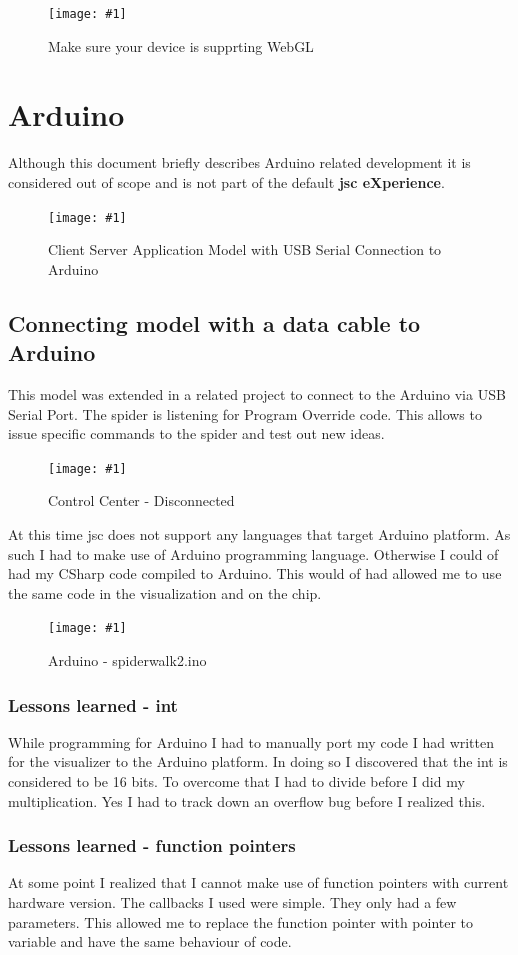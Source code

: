 \documentclass[12pt,leqno]{book}
\newcommand{\png}[1]{\texttt{[image: \#1]}}
\newcommand{\figpng}[2]{\begin{figure}[htb]\centering\png{#1}\caption{#2}\end{figure}}
\begin{document}
\figpng{Images/aboutgpu_-_Google_Chrome-2012-03-14_17.56.30}
{Make sure your device is supprting WebGL}





\chapter{Arduino}

Although this document briefly describes Arduino related development it is considered out of scope and is not part of the default \textbf{jsc eXperience}.

\figpng{Images/withusb}
{Client Server Application Model with USB Serial Connection to Arduino}

\section{Connecting model with a data cable to Arduino}
This model was extended in a related project to connect to the Arduino via USB Serial Port. 
The spider is listening for Program Override code. This allows to issue specific commands to the spider
and test out new ideas.

\figpng{Images/Hello_world_-_Google_Chrome-2012-03-15_08.11.17}
{Control Center - Disconnected}




At this time jsc does not support any languages that target Arduino platform. As such I had to make use of Arduino programming language. Otherwise I could of had my CSharp code compiled to Arduino. This would of had allowed me to use the same code in the visualization and on the chip.

\figpng{Images/spiderwalk2__Arduino_1.0-2012-03-14_18.04.43}
{Arduino - spiderwalk2.ino}


\subsection{Lessons learned - int}
While programming for Arduino I had to manually port my code I had written for the visualizer to the Arduino platform. In doing so I discovered that the int is considered to be 16 bits.  To overcome that I had to divide before I did my multiplication. Yes I had to track down an overflow bug before I realized this.

\subsection{Lessons learned - function pointers}
At some point I realized that I cannot make use of function pointers with current hardware version. The callbacks I used were simple. They only had a few parameters. This allowed me to replace the function pointer with pointer to variable and have the same behaviour of code.
\end{document}
